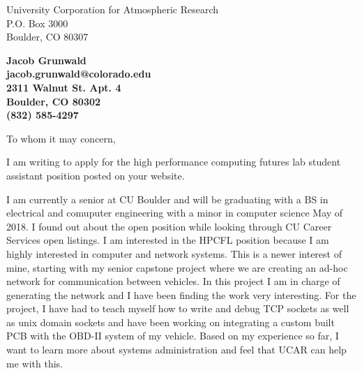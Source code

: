 \documentclass[11pt]{letter} %
\begin{document}

\begin{letter}{
University Corporation for Atmospheric Research \\
P.O. Box 3000 \\
Boulder, CO 80307}


\begin{center}
\large\bf Jacob Grunwald \\ jacob.grunwald@colorado.edu \\
2311 Walnut St. Apt. 4 \\ Boulder, CO 80302 \\ (832) 585-4297 %
\end{center}
\vfill



\opening{To whom it may concern,}

I am writing to apply for the high performance computing futures lab student assistant position posted on your website.

I am currently a senior at CU Boulder and will be graduating with a BS in electrical and comuputer engineering with a minor in computer science May of 2018. I found out about the open position while looking through CU Career Services open listings. I am interested in the HPCFL position because I am highly interested in computer and network systems. This is a newer interest of mine, starting with my senior capstone project where we are creating an ad-hoc network for communication between vehicles. In this project I am in charge of generating the network and I have been finding the work very interesting. For the project, I have had to teach myself how to write and debug TCP sockets as well as unix domain sockets and have been working on integrating a custom built PCB with the OBD-II system of my vehicle. Based on my experience so far, I want to learn more about systems administration and feel that UCAR can help me with this.


\end{letter}
\end{document}
